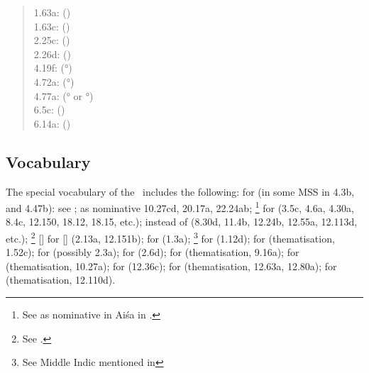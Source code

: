 \begin{quote}
1.63a:  () \\
1.63c:  () \\
2.25c:  () \\
2.26d:  () \\
4.19f:  (°) \\
4.72a:  (°) \\
4.77a:  (° or °)
 \\
6.5c:  () \\
6.14a:  () \\
\end{quote}




\subsection{Vocabulary}

The special vocabulary of the \VSS\ includes the following:
 for  (in some MSS in 4.3b, and 4.47b): 
        see ; 
 as nominative 10.27cd, 20.17a, 22.24ab;%
        \footnote{See  as nominative in Aiśa in .}
 for  (3.5c, 4.6a, 4.30a, 8.4c, 12.150,
 18.12, 18.15, etc.);
 instead of  (8.30d, 11.4b, 12.24b, 12.55a,
 12.113d, etc.);%
        \footnote{See .}
[] for [] (2.13a, 12.151b);
 for  (1.3a);%
        \footnote{See Middle Indic  mentioned in
        } 
 for  (1.12d);
 for  (thematisation, 1.52c);
 for  (possibly 2.3a);
 for  (2.6d);
 for  (thematisation, 9.16a);
 for  (thematisation, 10.27a);
 for  (12.36c);
 for  (thematisation, 12.63a, 12.80a);
 for  (thematisation, 12.110d).





